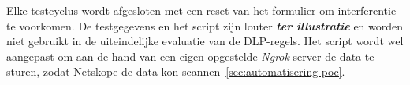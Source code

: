 Elke testcyclus wordt afgesloten met een reset van het formulier om interferentie te voorkomen. 
De testgegevens en het script zijn louter \textbf{\textit{ter illustratie}} en worden niet gebruikt in de uiteindelijke evaluatie van de DLP-regels.
Het script wordt wel aangepast om aan de hand van een eigen opgestelde \textit{Ngrok}-server de data te sturen, zodat Netskope de data kon scannen~\ref{sec:automatisering-poc}.



    
    
    
    
    
    
    
    

